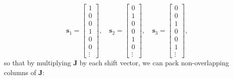 \documentclass{article}
\begin{document}
\begin{equation*}
    \symbf{s}_1 =
    \begin{bmatrix}
        1 \\
        0 \\
        0 \\
        1 \\
        0 \\
        0 \\
        \vdots
    \end{bmatrix}
    , \quad
    \symbf{s}_2 =
    \begin{bmatrix}
        0 \\
        1 \\
        0 \\
        0 \\
        1 \\
        0 \\
        \vdots
    \end{bmatrix}
    , \quad
    \symbf{s}_3 =
    \begin{bmatrix}
        0 \\
        0 \\
        1 \\
        0 \\
        0 \\
        1 \\
        \vdots
    \end{bmatrix}
    ,
\end{equation*}
so that by multiplying \(\symbf{J}\) by each shift vector, we can pack
non-overlapping columns of \(\symbf{J}\):
\end{document}
